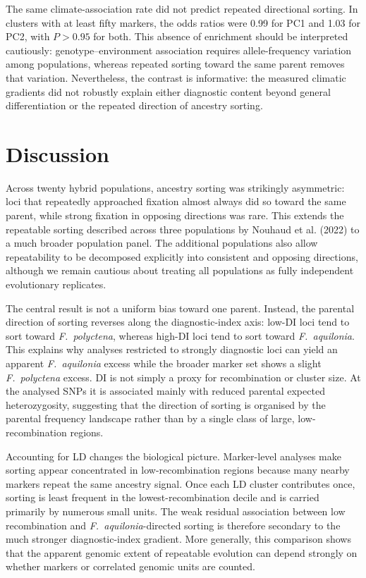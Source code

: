 \documentclass[11pt]{article}
\newcommand{\Faq}{\textit{F.~aquilonia}}
\newcommand{\Fpo}{\textit{F.~polyctena}}
\begin{document}
The same climate-association rate did not predict repeated directional
sorting. In clusters with at least fifty markers, the odds ratios were 0.99
for PC1 and 1.03 for PC2, with \(P>0.95\) for both. This absence of enrichment
should be interpreted cautiously: genotype--environment association requires
allele-frequency variation among populations, whereas repeated sorting toward
the same parent removes that variation. Nevertheless, the contrast is
informative: the measured climatic gradients did not robustly explain either
diagnostic content beyond general differentiation or the repeated direction
of ancestry sorting.

\section*{Discussion}

Across twenty hybrid populations, ancestry sorting was strikingly asymmetric:
loci that repeatedly approached fixation almost always did so toward the same
parent, while strong fixation in opposing directions was rare. This extends
the repeatable sorting described across three populations by Nouhaud et al.
(2022) to a much broader population panel. The additional populations also
allow repeatability to be decomposed explicitly into consistent and opposing
directions, although we remain cautious about treating all populations as
fully independent evolutionary replicates.

The central result is not a uniform bias toward one parent. Instead, the
parental direction of sorting reverses along the diagnostic-index axis:
low-DI loci tend to sort toward \Fpo{}, whereas high-DI loci tend to sort
toward \Faq{}. This explains why analyses restricted to strongly diagnostic
loci can yield an apparent \Faq{} excess while the broader marker set shows a
slight \Fpo{} excess. DI is not simply a proxy for recombination or cluster
size. At the analysed SNPs it is associated mainly with reduced parental
expected heterozygosity, suggesting that the direction of sorting is organised
by the parental frequency landscape rather than by a single class of large,
low-recombination regions.

Accounting for LD changes the biological picture. Marker-level analyses make
sorting appear concentrated in low-recombination regions because many nearby
markers repeat the same ancestry signal. Once each LD cluster contributes once,
sorting is least frequent in the lowest-recombination decile and is carried
primarily by numerous small units. The weak residual association between low
recombination and \Faq-directed sorting is therefore secondary to the much
stronger diagnostic-index gradient. More generally, this comparison shows that
the apparent genomic extent of repeatable evolution can depend strongly on
whether markers or correlated genomic units are counted.
\end{document}
